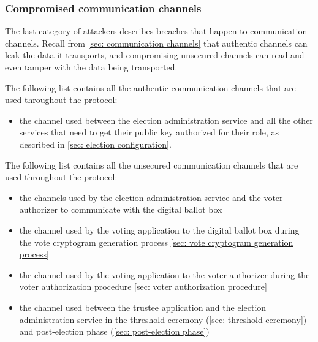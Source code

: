 \subsubsection{Compromised communication channels} \label{sec: compromised communication channels}
The last category of attackers describes breaches that happen to communication channels. Recall from \cref{sec: communication channels} that authentic channels can leak the data it transports, and compromising unsecured channels can read and even tamper with the data being transported.

The following list contains all the authentic communication channels that are used throughout the protocol:
\begin{itemize}
    \item the channel used between the election administration service and all the other services that need to get their public key authorized for their role, as described in \cref{sec: election configuration}. 
\end{itemize}

The following list contains all the unsecured communication channels that are used throughout the protocol:
\begin{itemize}
    \item the channels used by the election administration service and the voter authorizer to communicate with the digital ballot box
    \item the channel used by the voting application to the digital ballot box during the vote cryptogram generation process \cref{sec: vote cryptogram generation process}
    \item the channel used by the voting application to the voter authorizer during the voter authorization procedure \cref{sec: voter authorization procedure}
    \item the channel used between the trustee application and the election administration service in the threshold ceremony (\cref{sec: threshold ceremony}) and post-election phase (\cref{sec: post-election phase})
\end{itemize}
